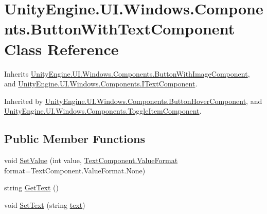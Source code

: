 \hypertarget{class_unity_engine_1_1_u_i_1_1_windows_1_1_components_1_1_button_with_text_component}{}\section{Unity\+Engine.\+U\+I.\+Windows.\+Components.\+Button\+With\+Text\+Component Class Reference}
\label{class_unity_engine_1_1_u_i_1_1_windows_1_1_components_1_1_button_with_text_component}


Inherits \hyperlink{class_unity_engine_1_1_u_i_1_1_windows_1_1_components_1_1_button_with_image_component}{Unity\+Engine.\+U\+I.\+Windows.\+Components.\+Button\+With\+Image\+Component}, and \hyperlink{interface_unity_engine_1_1_u_i_1_1_windows_1_1_components_1_1_i_text_component}{Unity\+Engine.\+U\+I.\+Windows.\+Components.\+I\+Text\+Component}.



Inherited by \hyperlink{class_unity_engine_1_1_u_i_1_1_windows_1_1_components_1_1_button_hover_component}{Unity\+Engine.\+U\+I.\+Windows.\+Components.\+Button\+Hover\+Component}, and \hyperlink{class_unity_engine_1_1_u_i_1_1_windows_1_1_components_1_1_toggle_item_component}{Unity\+Engine.\+U\+I.\+Windows.\+Components.\+Toggle\+Item\+Component}.

\subsection*{Public Member Functions}
\begin{DoxyCompactItemize}
\item 
void \hyperlink{class_unity_engine_1_1_u_i_1_1_windows_1_1_components_1_1_button_with_text_component_a15914e9a773c3cdb1c83d019df1cca18}{Set\+Value} (int value, \hyperlink{class_unity_engine_1_1_u_i_1_1_windows_1_1_components_1_1_text_component_adf4a7bac85dfe1b32ebe6309e5386f89}{Text\+Component.\+Value\+Format} format=Text\+Component.\+Value\+Format.\+None)
\item 
string \hyperlink{class_unity_engine_1_1_u_i_1_1_windows_1_1_components_1_1_button_with_text_component_a6eee53ea3e5335aaf660e62c843981d9}{Get\+Text} ()
\item 
void \hyperlink{class_unity_engine_1_1_u_i_1_1_windows_1_1_components_1_1_button_with_text_component_a592fdd78729d3c116663716c1f314441}{Set\+Text} (string \hyperlink{class_unity_engine_1_1_u_i_1_1_windows_1_1_components_1_1_button_with_text_component_ae4f933bea7cb72f631e58a991e74f845}{text})
\end{DoxyCompactItemize}
